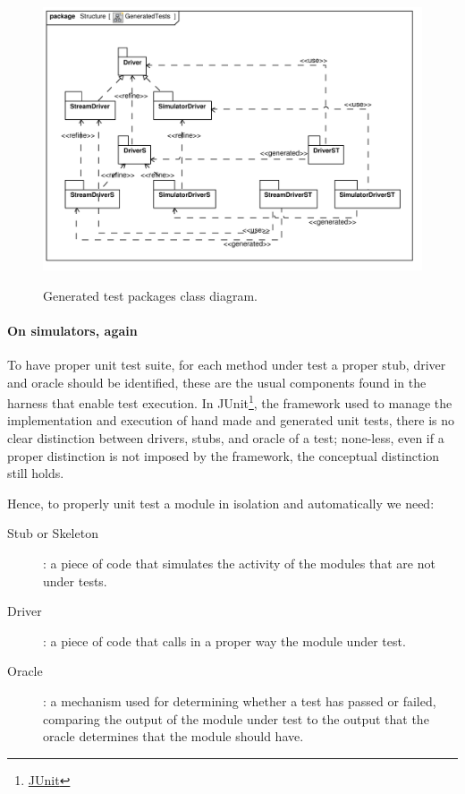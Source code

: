 \documentclass{article} \usepackage{times}
\newcommand{\myhref}[2]{\ifpdf\href{#1}{#2}\else\htmladdnormallinkfoot{#2}{#1}\fi}
\begin{document}
\begin{figure}[htb!]
  \centering
  \includegraphics[scale=0.7]{UML_model/Class_Diagram__Structure__GeneratedTests}
  \label{fig:class_diagram_generatedtest}
  \caption{Generated test packages class diagram.}
\end{figure}

\paragraph*{On simulators, again}

To have proper unit test suite, for each method under test a proper
stub, driver and oracle should be identified, these are the usual
components found in the harness that enable test
execution\cite{Binder1999}.  In
JUnit\footnote{\myhref{http://www.junit.org/}{JUnit}}, the framework
used to manage the implementation and execution of hand made and
generated unit tests, there is no clear distinction between drivers,
stubs, and oracle of a test; none-less, even if a proper distinction
is not imposed by the framework, the conceptual distinction still
holds.

Hence, to properly unit test a module in isolation and automatically
we need:

\begin{description}
\item[Stub or Skeleton]: a piece of code that simulates the activity
  of the modules that are not under tests.
\item[Driver]: a piece of code that calls in a proper way the module
  under test.
\item[Oracle]: a mechanism used for determining whether a test has
  passed or failed, comparing the output of the module under test to
  the output that the oracle determines that the module should have.
\end{description}
\end{document}
